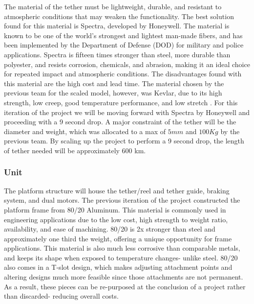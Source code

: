 \indent\indent The material of the tether must be lightweight, durable, and resistant to atmospheric conditions that may weaken the functionality. The best solution found for this material is Spectra, developed by Honeywell. The material is known to be one of the world’s strongest and lightest man-made fibers, and has been implemented by the Department of Defense (DOD) for military and police applications. Spectra is fifteen times stronger than steel, more durable than polyester, and resists corrosion, chemicals, and abrasion, making it an ideal choice for repeated impact and atmospheric conditions. The disadvantages found with this material are the high cost and lead time. The material chosen by the previous team for the scaled model, however, was Kevlar, due to its high strength, low creep, good temperature performance, and low stretch \cite{trt}. For this iteration of the project we will be moving forward with Spectra by Honeywell and proceeding with a 9 second drop. A major constraint of the tether will be the diameter and weight, which was allocated to a max of $5 mm$ and $100 Kg$ by the previous team. By scaling up the project to perform a 9 second drop, the length of tether needed will be approximately 600 km.


\subsubsection{Unit}

\indent\indent The platform structure will house the tether/reel and tether guide, braking system, and dual motors. The previous iteration of the project constructed the platform frame from 80/20 Aluminum. This material is commonly used in engineering applications due to the low cost, high strength to weight ratio, availability, and ease of machining. 80/20 is 2x stronger than steel and approximately one third the weight, offering a unique opportunity for frame applications. This material is also much less corrosive than comparable metals, and keeps its shape when exposed to temperature changes- unlike steel. 80/20 also comes in a T-slot design, which makes adjusting attachment points and altering designs much more feasible since those attachments are not permanent. As a result, these pieces can be re-purposed at the conclusion of a project rather than discarded- reducing overall costs. 


